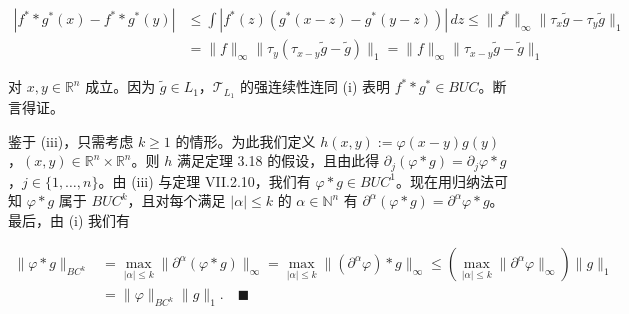 \begin{theorem}
\begin{subitems}
\begin{equation*}
\begin{aligned}
|f^{*} * g^{*}(x) - f^{*} * g^{*}(y)| &\le \int |f^{*}(z)(g^{*}(x-z) - g^{*}(y-z))|\,dz \le \|f^{*}\|_{\infty}\|\tau_{x}\tilde{g} - \tau_{y}\tilde{g}\|_{1} \\ &= \|f\|_{\infty}\|\tau_{y}(\tau_{x-y}\tilde{g} - \tilde{g})\|_{1} = \|f\|_{\infty}\|\tau_{x-y}\tilde{g} - \tilde{g}\|_{1}
\end{aligned}
\end{equation*}

对 $ x, y \in \mathbb{R}^{n} $ 成立。因为 $ \tilde{g} \in L_{1} $，$ \mathcal{T}_{L_{1}} $ 的强连续性连同 (i) 表明 $ f^{*} * g^{*} \in BUC $。断言得证。

\item[（iv）]

鉴于 (iii)，只需考虑 $ k \ge 1 $ 的情形。为此我们定义 $ h(x,y) := \varphi(x-y)g(y) $，$ (x,y) \in \mathbb{R}^{n} \times \mathbb{R}^{n} $。则 $ h $ 满足定理 3.18 的假设，且由此得 $ \partial_{j}(\varphi * g) = \partial_{j}\varphi * g $，$ j \in \{1,\ldots,n\} $。由 (iii) 与定理 VII.2.10，我们有 $ \varphi * g \in BUC^{1} $。现在用归纳法可知 $ \varphi * g $ 属于 $ BUC^{k} $，且对每个满足 $ |\alpha| \le k $ 的 $ \alpha \in \mathbb{N}^{n} $ 有 $ \partial^{\alpha}(\varphi * g) = \partial^{\alpha}\varphi * g $。最后，由 (i) 我们有

\begin{equation*}
\begin{aligned}
\|\varphi * g\|_{BC^{k}} &= \max_{|\alpha| \le k}\|\partial^{\alpha}(\varphi * g)\|_{\infty} = \max_{|\alpha| \le k}\|(\partial^{\alpha}\varphi) * g\|_{\infty} \le \left(\max_{|\alpha| \le k}\|\partial^{\alpha}\varphi\|_{\infty}\right)\|g\|_{1} \\ &= \|\varphi\|_{BC^{k}}\|g\|_{1} . \quad \blacksquare
\end{aligned}
\end{equation*}
\end{subitems}

\end{theorem}

